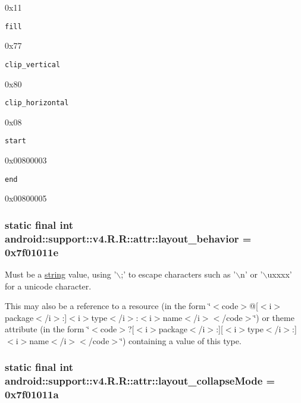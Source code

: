 0x11

{\tt fill}

0x77

{\tt clip\_\-vertical}

0x80

{\tt clip\_\-horizontal}

0x08

{\tt start}

0x00800003

{\tt end}

0x00800005\hypertarget{classandroid_1_1support_1_1v4_1_1_r_1_1attr_a9aef85beb8bc006fb87ab1f9eb178f3}{
\subsubsection[{layout\_\-behavior}]{\setlength{\rightskip}{0pt plus 5cm}static final int android::support::v4.R.R::attr::layout\_\-behavior = 0x7f01011e}}
\label{classandroid_1_1support_1_1v4_1_1_r_1_1attr_a9aef85beb8bc006fb87ab1f9eb178f3}


Must be a \hyperlink{classandroid_1_1support_1_1v4_1_1_r_1_1string}{string} value, using '$\backslash$;' to escape characters such as '$\backslash$n' or '$\backslash$uxxxx' for a unicode character. 

This may also be a reference to a resource (in the form \char`\"{}$<$code$>$@\mbox{[}$<$i$>$package$<$/i$>$:\mbox{]}$<$i$>$type$<$/i$>$:$<$i$>$name$<$/i$>$$<$/code$>$\char`\"{}) or theme attribute (in the form \char`\"{}$<$code$>$?\mbox{[}$<$i$>$package$<$/i$>$:\mbox{]}\mbox{[}$<$i$>$type$<$/i$>$:\mbox{]}$<$i$>$name$<$/i$>$$<$/code$>$\char`\"{}) containing a value of this type. \hypertarget{classandroid_1_1support_1_1v4_1_1_r_1_1attr_d72f2c23e1ab82ddcae4fa409421133b}{
\subsubsection[{layout\_\-collapseMode}]{\setlength{\rightskip}{0pt plus 5cm}static final int android::support::v4.R.R::attr::layout\_\-collapseMode = 0x7f01011a}}
\label{classandroid_1_1support_1_1v4_1_1_r_1_1attr_d72f2c23e1ab82ddcae4fa409421133b}


